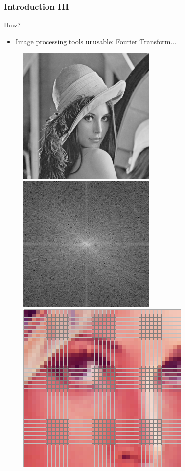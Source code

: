 \documentclass{beamer}
\begin{document}
\begin{frame}
    \frametitle{Introduction III}

    How?
    \begin{itemize}
        \item Image processing tools unusable: Fourier Transform...
    \end{itemize}

    \begin{figure}
        \centering
        \includegraphics[scale=0.3]{img/lena}
        \hspace{0.5cm}
        \includegraphics[scale=0.3]{img/lena-ft}
        \hspace{0.5cm}
        \includegraphics[scale=0.24]{img/image-pixels}
    \end{figure}


\end{frame}
\end{document}
